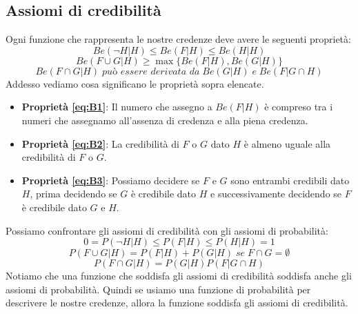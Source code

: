 \documentclass[../main.tex]{subfiles}
\begin{document}
\subsection{Assiomi di credibilità}\label{sub:assiomi_credibilita}
Ogni funzione che rappresenta le nostre credenze deve avere le seguenti proprietà:
\begin{equation}
    \label{eq:B1}
    Be(\lnot H|H) \leq Be(F|H) \leq Be(H|H)
\end{equation}
\begin{equation}
    \label{eq:B2}
    Be(F\cup G|H) \geq \max \{ Be(F|H),Be(G|H)\} 
\end{equation}
\begin{equation}
    \label{eq:B3}
    Be(F \cap G|H) \;\textit{può essere derivata da}\;  Be(G|H) \;\textit{e}\; Be(F|G \cap H)
\end{equation}
\hfill \break
Addesso vediamo cosa significano le proprietà sopra elencate.
\begin{itemize}
    \item \textbf{Proprietà \ref{eq:B1}}: Il numero che assegno a $Be(F|H)$ è compreso tra i numeri che assegnamo all'assenza di credenza e alla piena credenza.
    \item \textbf{Proprietà \ref{eq:B2}}: La credibilità di $F$ o $G$ dato $H$ è almeno uguale alla credibilità di $F$ o $G$.
    \item \textbf{Proprietà \ref{eq:B3}}: Possiamo decidere se $F$ e $G$ sono entrambi credibili dato $H$, prima decidendo se $G$ è credibile dato $H$ e successivamente decidendo se $F$ è credibile dato $G$ e $H$.
\end{itemize}
\hfill \break
Possiamo confrontare gli assiomi di credibilità con gli assiomi di probabilità:
\begin{equation}
    \label{eq:P1}
    0=P(\lnot H|H) \leq P(F|H) \leq P(H|H)=1
\end{equation}
\begin{equation}
    \label{eq:P2}
    P(F\cup G|H) = P(F|H)+P(G|H) \;\textit{se}\; F \cap G = \emptyset
\end{equation}
\begin{equation}
    \label{eq:P3}
    P(F \cap G|H) = P(G|H)P(F|G \cap H)
\end{equation}
\hfill \break
Notiamo che una funzione che soddisfa gli assiomi di credibilità soddisfa anche gli assiomi di probabilità. Quindi se usiamo una funzione di probabilità per descrivere le nostre credenze, allora la funzione soddisfa gli assiomi di credibilità.
\end{document}
